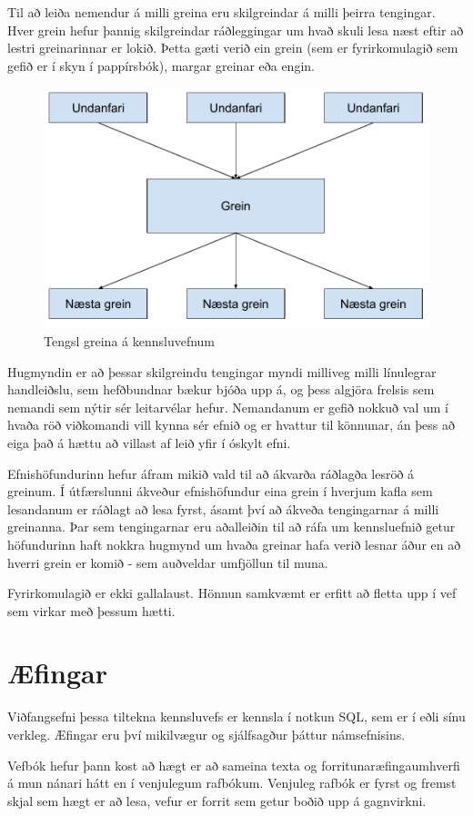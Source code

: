 \documentclass[a4paper,12pt,twoside,BCOR=10mm]{scrbook}
\begin{document}
Til að leiða nemendur á milli greina eru skilgreindar á milli þeirra tengingar. Hver grein hefur þannig skilgreindar ráðleggingar um hvað skuli lesa næst eftir að lestri greinarinnar er lokið. Þetta gæti verið ein grein (sem er fyrirkomulagið sem gefið er í skyn í pappírsbók), margar greinar eða engin.
\begin{figure}
\caption{Tengsl greina á kennsluvefnum}
\begin{center}
\includegraphics[width=0.6\linewidth]{Undanfarar}
\end{center}
\end{figure}
Hugmyndin er að þessar skilgreindu tengingar myndi milliveg milli línulegrar handleiðslu, sem hefðbundnar bækur bjóða upp á, og þess algjöra frelsis sem nemandi sem nýtir sér leitarvélar hefur. Nemandanum er gefið nokkuð val um í hvaða röð viðkomandi vill kynna sér efnið og er hvattur til könnunar, án þess að eiga það á hættu að villast af leið yfir í óskylt efni.

Efnishöfundurinn hefur áfram mikið vald til að ákvarða ráðlagða lesröð á greinum. Í útfærslunni ákveður efnishöfundur eina grein í hverjum kafla sem lesandanum er ráðlagt að lesa fyrst, ásamt því að ákveða tengingarnar á milli greinanna. Þar sem tengingarnar eru aðalleiðin til að ráfa um kennsluefnið getur höfundurinn haft nokkra hugmynd um hvaða greinar hafa verið lesnar áður en að hverri grein er komið - sem auðveldar umfjöllun til muna.

Fyrirkomulagið er ekki gallalaust. Hönnun samkvæmt er erfitt að fletta upp í vef sem virkar með þessum hætti. %

\section{Æfingar}
\label{sec:exercise-explanation}
Viðfangsefni þessa tiltekna kennsluvefs er kennsla í notkun SQL, sem er í eðli sínu verkleg. Æfingar eru því mikilvægur og sjálfsagður þáttur námsefnisins.

Vefbók hefur þann kost að hægt er að sameina texta og forritunaræfingaumhverfi á mun nánari hátt en í venjulegum rafbókum. Venjuleg rafbók er fyrst og fremst skjal sem hægt er að lesa, vefur er forrit sem getur boðið upp á gagnvirkni.
\end{document}
